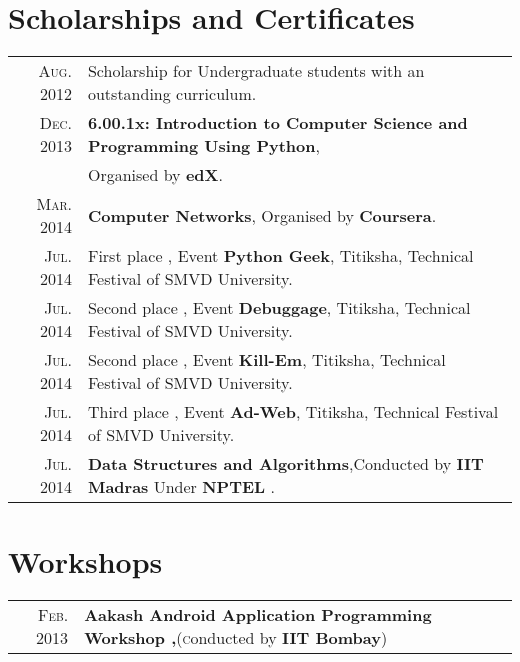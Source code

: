 \documentclass[a4paper,10pt]{article}
\begin{document}
\section{Scholarships and Certificates}
\begin{tabular}{rl}
 \textsc{Aug.} 2012 & Scholarship for Undergraduate students with an outstanding curriculum. \normalsize\\
 \textsc{Dec.} 2013 & \normalsize\textbf{6.00.1x: Introduction to Computer Science and Programming Using Python},\\ & Organised by \normalsize\textbf{edX}.\\
 \textsc{Mar.} 2014 & \normalsize\textbf{Computer Networks}, Organised by \normalsize\textbf{Coursera}.\\
 \textsc{Jul.} 2014 & First place , Event \normalsize\textbf{Python Geek}, Titiksha, Technical Festival of SMVD University.\normalsize\\
 \textsc{Jul.} 2014 & Second place , Event \normalsize\textbf{Debuggage}, Titiksha, Technical Festival of SMVD University.\normalsize\\
 \textsc{Jul.} 2014 & Second place , Event \normalsize\textbf{Kill-Em}, Titiksha, Technical Festival of SMVD University.\normalsize\\
 \textsc{Jul.} 2014 & Third place , Event \normalsize\textbf{Ad-Web}, Titiksha, Technical Festival of SMVD University.\normalsize\\
 \textsc{Jul.} 2014 & \normalsize\textbf{Data Structures and Algorithms},Conducted by  \normalsize\textbf{IIT Madras} Under  \normalsize\textbf{NPTEL} .\normalsize\\
\end{tabular}


\section{Workshops}
\begin{tabular}{rl}
 \textsc{Feb.} 2013 & {\normalsize\textbf{Aakash Android Application Programming Workshop ,}}(\textsc conducted by \normalsize\textbf{IIT Bombay})\\
\end{tabular}

\end{document}

